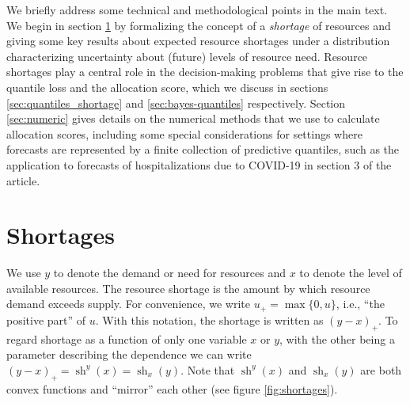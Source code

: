 \documentclass{article}\usepackage[]{graphicx}\usepackage[]{xcolor}
\DeclareMathOperator{\short}{sh}
\begin{document}
We briefly address some technical and methodological points in the main text. We begin in section \ref{sec:shortage} by formalizing the concept of a \emph{shortage} of resources and giving some key results about expected resource shortages under a distribution characterizing uncertainty about (future) levels of resource need. Resource shortages play a central role in the decision-making problems that give rise to the quantile loss and the allocation score, which we discuss in sections \ref{sec:quantiles_shortage} and \ref{sec:bayes-quantiles} respectively. Section \ref{sec:numeric} gives details on the numerical methods that we use to calculate allocation scores, including some special considerations for settings where forecasts are represented by a finite collection of predictive quantiles, such as the application to forecasts of hospitalizations due to COVID-19 in section 3 of the article.

\section{Shortages}
\label{sec:shortage}

We use $y$ to denote the demand or need for resources and $x$ to denote the level of available resources.
The resource shortage is the amount by which resource demand exceeds supply. 
For convenience, we write $u_{+} = \max\{0,u\}$, i.e., ``the positive part'' of $u$.
With this notation, the shortage is written as $(y - x)_{+}$. To regard shortage as a function of only one 
variable $x$ or $y$, with the other being a parameter describing the dependence we can write 
$(y - x)_{+} = \short^{y}(x) = \short_{x}(y)$.  Note that 
$\short^{y}(x)$ and $\short_{x}(y)$ are both convex functions and ``mirror'' each other (see figure \ref{fig:shortages}).
\end{document}
